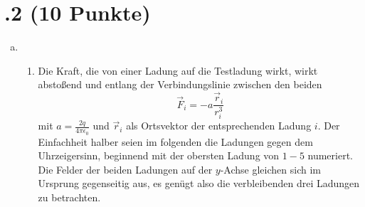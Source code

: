 \section*{\nr.2 \tittwo (10 Punkte)}
\begin{enumerate}[(a)]
\item
\begin{enumerate}[(1)]
\item Die Kraft, die von einer Ladung auf die Testladung wirkt, wirkt abstoßend und entlang der Verbindungslinie zwischen den beiden
\begin{equation}
  \vec F_i=-a \frac{\vec r_i}{r_i^3}
\end{equation}
mit $a=\frac{2q}{4\pi\epsilon_0}$ und $\vec r_i$ als Ortsvektor der entsprechenden Ladung $i$. Der Einfachheit halber seien im folgenden die Ladungen gegen dem Uhrzeigersinn, beginnend mit der obersten Ladung von $1-5$ numeriert.
Die Felder der beiden Ladungen auf der $y$-Achse gleichen sich im Ursprung gegenseitig aus, es genügt also die verbleibenden drei Ladungen zu betrachten. 

\end{enumerate}
\end{enumerate}